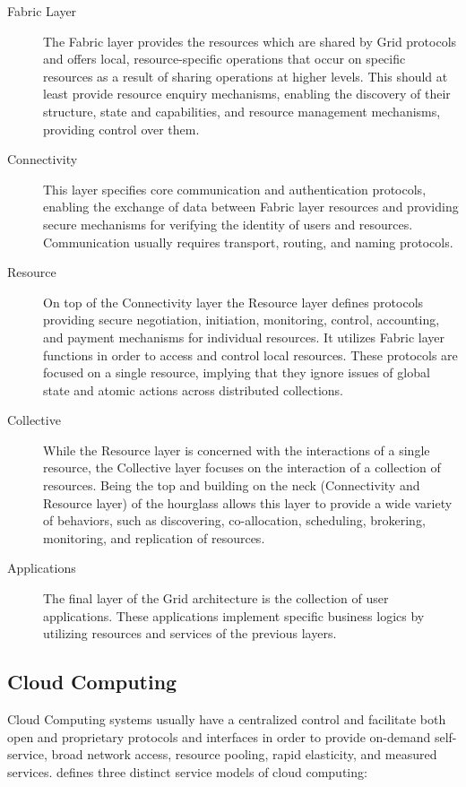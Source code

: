 \begin{description}
  \item[Fabric Layer]
    The Fabric layer provides the resources which are shared by Grid protocols
    and offers local, resource-specific operations that occur on specific
    resources as a result of sharing operations at higher levels. This should at
    least provide resource enquiry mechanisms, enabling the discovery of their
    structure, state and capabilities, and resource management mechanisms,
    providing control over them.
  \item[Connectivity]
    This layer specifies core communication and authentication protocols,
    enabling the exchange of data between Fabric layer resources and providing
    secure mechanisms for verifying the identity of users and resources.
    Communication usually requires transport, routing, and naming protocols.
  \item[Resource]
    On top of the Connectivity layer the Resource layer defines protocols
    providing secure negotiation, initiation, monitoring, control, accounting,
    and payment mechanisms for individual resources. It utilizes Fabric layer
    functions in order to access and control local resources. These protocols
    are focused on a single resource, implying that they ignore issues of global
    state and atomic actions across distributed collections.
  \item[Collective]
    While the Resource layer is concerned with the interactions of a single
    resource, the Collective layer focuses on the interaction of a collection of
    resources. Being the top and building on the neck (Connectivity and Resource
    layer) of the hourglass allows this layer to provide a wide variety of
    behaviors, such as discovering, co-allocation, scheduling, brokering,
    monitoring, and replication of resources.
  \item[Applications]
    The final layer of the Grid architecture is the collection of user
    applications. These applications implement specific business logics by
    utilizing resources and services of the previous layers.
\end{description}

\subsection{Cloud Computing}

Cloud Computing systems usually have a centralized control and facilitate both
open and proprietary protocols and interfaces in order to provide on-demand
self-service, broad network access, resource pooling, rapid elasticity, and
measured services.  \cite{mell2011} defines three distinct
service models of cloud computing:

